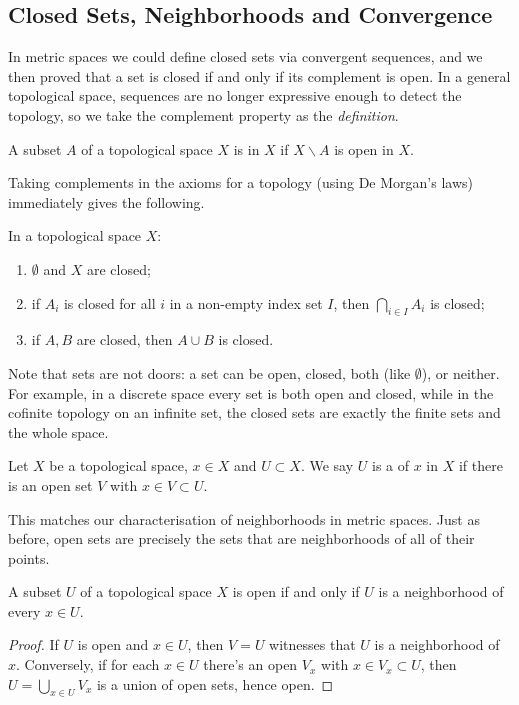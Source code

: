 \subsection{Closed Sets, Neighborhoods and Convergence}

In metric spaces we could define closed sets via convergent sequences, and we then proved that a set is closed if and only if its complement is open. In a general topological space, sequences are no longer expressive enough to detect the topology, so we take the complement property as the \emph{definition}.

\begin{definition}
    A subset $A$ of a topological space $X$ is  in $X$ if $X \backslash A$ is open in $X$.
\end{definition}

Taking complements in the axioms for a topology (using De Morgan's laws) immediately gives the following.

\begin{proposition}
    In a topological space $X$:
    \begin{enumerate}[label=(\roman*)]
        \item $\emptyset$ and $X$ are closed;
        \item if $A_i$ is closed for all $i$ in a non-empty index set $I$, then $\bigcap_{i \in I} A_i$ is closed;
        \item if $A, B$ are closed, then $A \cup B$ is closed.
    \end{enumerate}
\end{proposition}

Note that sets are not doors: a set can be open, closed, both (like $\emptyset$), or neither. For example, in a discrete space every set is both open and closed, while in the cofinite topology on an infinite set, the closed sets are exactly the finite sets and the whole space.

\begin{definition}[Neighborhood]
    Let $X$ be a topological space, $x \in X$ and $U \subset X$. We say $U$ is a  of $x$ in $X$ if there is an open set $V$ with $x \in V \subset U$.
\end{definition}

This matches our characterisation of neighborhoods in metric spaces. Just as before, open sets are precisely the sets that are neighborhoods of all of their points.

\begin{proposition}
    A subset $U$ of a topological space $X$ is open if and only if $U$ is a neighborhood of every $x \in U$.
\end{proposition}
\begin{proof}
    If $U$ is open and $x \in U$, then $V = U$ witnesses that $U$ is a neighborhood of $x$. Conversely, if for each $x \in U$ there's an open $V_x$ with $x \in V_x \subset U$, then $U = \bigcup_{x \in U} V_x$ is a union of open sets, hence open.
\end{proof}

